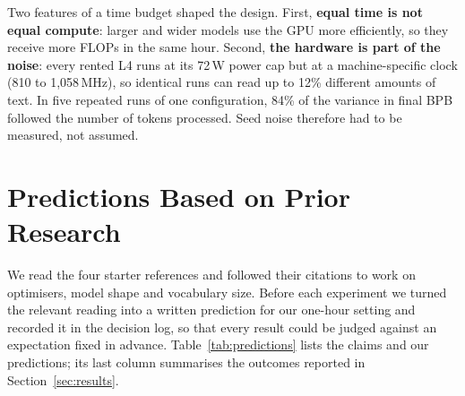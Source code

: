 \documentclass[11pt,a4paper]{article}
\begin{document}
Two features of a time budget shaped the design. First, \textbf{equal time is not equal compute}: larger and wider models use the GPU more efficiently, so they receive more FLOPs in the same hour. Second, \textbf{the hardware is part of the noise}: every rented L4 runs at its 72\,W power cap but at a machine-specific clock (810 to 1,058\,MHz), so identical runs can read up to 12\% different amounts of text. In five repeated runs of one configuration, 84\% of the variance in final BPB followed the number of tokens processed. Seed noise therefore had to be measured, not assumed.

\section{Predictions Based on Prior Research}\label{sec:predictions}

We read the four starter references and followed their citations to work on optimisers, model shape and vocabulary size. Before each experiment we turned the relevant reading into a written prediction for our one-hour setting and recorded it in the decision log, so that every result could be judged against an expectation fixed in advance. Table~\ref{tab:predictions} lists the claims and our predictions; its last column summarises the outcomes reported in Section~\ref{sec:results}.
\end{document}
